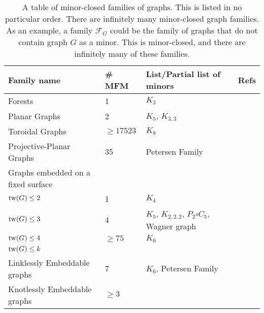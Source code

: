 \begin{table}[h!]
    
    \centering
    \begin{tabular*}{\textwidth}{@{}llll@{}}
    \toprule
    Family name                  & \# MFM & List/Partial list of minors                      & Refs \\ \midrule
    Forests                      & 1                                  & $K_3$                                            &            \\
    Planar Graphs                & 2                                  & $K_5$, $K_{3,3}$                                 & \tablefootnote{\textcite{wagnerUeberEigenschaftEbenen1937}}           \\
    Toroidal Graphs              & $\geq 17523$                       & $K_8$                                            & \tablefootnote{\textcite{myrvoldLargeSetTorus2018}}           \\
    Projective-Planar Graphs     & 35                                 & Petersen Family                                  & \tablefootnote{\textcite{moharGraphsSurfaces2001}}           \\
    Graphs embedded on a fixed surface & & &\\
    $\operatorname{tw}(G) \leq 2$              & 1                                  & $K_4$                                            &            \\
    $\operatorname{tw}(G) \leq 3$              & 4                                  & $K_5$, $K_{2,2,2}$, $P_2 \square C_5$, Wagner graph & \tablefootnote{\textcite{arnborgForbiddenMinorsCharacterization1990}}           \\
    $\operatorname{tw}(G) \leq 4$              & $\geq 75$                          & $K_6$                                            & \tablefootnote{\textcite{sandersLinearAlgorithmsGraphs1993}}           \\
    $\operatorname{tw}(G) \leq k$              &                                    &                                                  &            \\
    Linklessly Embeddable graphs & 7                                  & $K_6$, Petersen Family                           & \tablefootnote{\textcite{conwayKnotsLinksSpatial1983}} \\
    Knotlessly Embeddable graphs & $\geq 3$                           &                                                  & \tablefootnote{\textcite{conwayKnotsLinksSpatial1983,foisyIntrinsicallyKnottedGraphs2002,foisyNewlyRecognizedIntrinsically2003}}          
    \end{tabular*}
    \caption[Table of Minor-Closed Families of graphs]{A table of minor-closed families of graphs. This is listed in no particular order. There are infinitely many minor-closed graph families. As an example, a family $\mathcal{F}_G$ could be the family of graphs that do not contain graph $G$ as a minor. This is minor-closed, and there are infinitely many of these families.}\label{tab:minor-closed families}
    \end{table}
